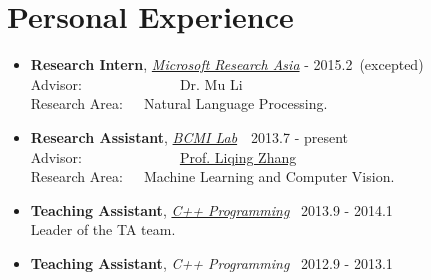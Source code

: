 \documentclass[letterpaper]{article}
\begin{document}
\section*{Personal Experience}
\begin{itemize}
\item \textbf{Research Intern}, \emph{\href{http://research.microsoft.com/en-us/labs/asia/}{Microsoft Research Asia}}  - 2015.2~(excepted)\\
    Advisor:~~~~~~~~~~~~~~{Dr. Mu Li}\\
    Research Area:~~~Natural Language Processing.
\item \textbf{Research Assistant}, \emph{\href{http://bcmi.sjtu.edu.cn}{BCMI Lab}}\qquad\qquad\qquad~~2013.7 - present\\
    Advisor:~~~~~~~~~~~~~~{\href{http://bcmi.sjtu.edu.cn/~zhangliqing/}{Prof. Liqing Zhang}}\\
    Research Area:~~~Machine Learning and Computer Vision.
\item \textbf{Teaching Assistant},  \emph{\href{http://acm.sjtu.edu.cn/wiki/Programming_2013}{C++ Programming}}\qquad~ 2013.9 - 2014.1\\
Leader of the TA team.
\item \textbf{Teaching Assistant},  \emph{C++ Programming}\qquad~ 2012.9 - 2013.1\\
\end{itemize}
\end{document}
